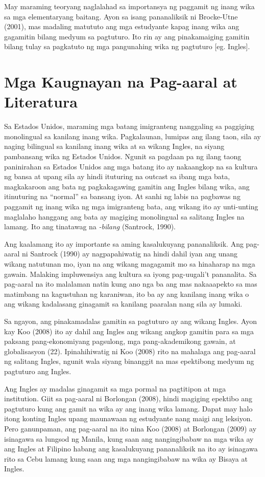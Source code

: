 \documentclass [11pt] {report}
\begin{document}
May maraming teoryang naglalahad sa importansya ng paggamit ng inang wika sa mga
elementaryang baitang. Ayon sa isang pananaliksik ni Brocke-Utne (2001), mas
madaling matututo ang mga estudyante kapag inang wika ang gagamitin bilang
medyum sa pagtuturo. Ito rin ay ang pinakamaiging gamitin bilang tulay sa
pagkatuto ng mga pangunahing wika ng pagtuturo [eg. Ingles].
\pagebreak
\section {Mga Kaugnayan na Pag-aaral at Literatura}
Sa Estados Unidos, maraming mga batang imigranteng nanggaling sa paggiging
monolingual sa kanilang inang wika. Pagkalaunan, lumipas ang ilang taon, sila ay
naging bilingual sa kanilang inang wika at sa wikang Ingles, na siyang
pambansang wika ng Estados Unidos. Ngunit sa pagdaan pa ng ilang taong
paninirahan sa Estados Unidos ang mga batang ito ay nakaangkop na sa kultura ng
bansa at upang sila ay hindi ituturing na outcast sa ibang mga bata, magkakaroon
ang bata ng pagkakagawing gamitin ang Ingles bilang wika, ang itinuturing na
``normal'' sa bansang iyon. At sanhi ng labis na pagbawas ng paggamit ng inang
wika ng mga imigranteng bata, ang wikang ito ay unti-unting maglalaho hanggang
ang bata ay magiging monolingual sa salitang Ingles na lamang. Ito ang tinatawag
na \emph{\gls{-bilang}} (Santrock, 1990).

Ang kaalamang ito ay importante sa aming kasalukuyang pananaliksik. Ang
pag-aaral ni Santrock (1990) ay nagpapahiwatig na hindi dahil iyan ang unang
wikang natutunan mo, iyan na ang wikang magagamit mo sa hinaharap na mga gawain.
Malaking impluwensiya ang kultura sa iyong pag-uugali't pananalita. Sa pag-aaral
na ito malalaman natin kung ano nga ba ang mas nakaaapekto sa mas matimbang na
kagustuhan ng karaniwan, ito ba ay ang kanilang inang wika o ang wikang
kadalasang ginagamit sa kanilang paaralan nang sila ay lumaki.

Sa ngayon, ang pinakamadalas gamitin sa pagtuturo ay ang wikang Ingles. Ayon kay
Koo (2008) ito ay dahil ang Ingles ang wikang angkop gamitin para sa mga paksang
pang-ekonomiyang pagsulong, mga pang-akademikong gawain, at globalisasyon (22).
Ipinahihiwatig ni Koo (2008) rito na mahalaga ang pag-aaral ng salitang Ingles,
ngunit wala siyang binanggit na mas epektibong medyum ng pagtuturo ang Ingles.

Ang Ingles ay madalas ginagamit sa mga pormal na pagtitipon at mga institution.
Giit sa pag-aaral ni Borlongan (2008), hindi magiging epektibo ang pagtuturo
kung ang gamit na wika ay ang inang wika lamang. Dapat may halo itong konting
Ingles upang maunawaan ng estudyante nang maigi ang leksiyon. Pero ganunpaman,
ang pag-aaral na ito nina Koo (2008) at Borlongan (2009) ay isinagawa sa lungsod
ng Manila, kung saan ang nangingibabaw na mga wika ay ang Ingles at Filipino
habang ang kasalukuyang pananaliksik na ito ay isinagawa rito sa Cebu lamang
kung saan ang mga nangingibabaw na wika ay Bisaya at Ingles.
\end{document}
